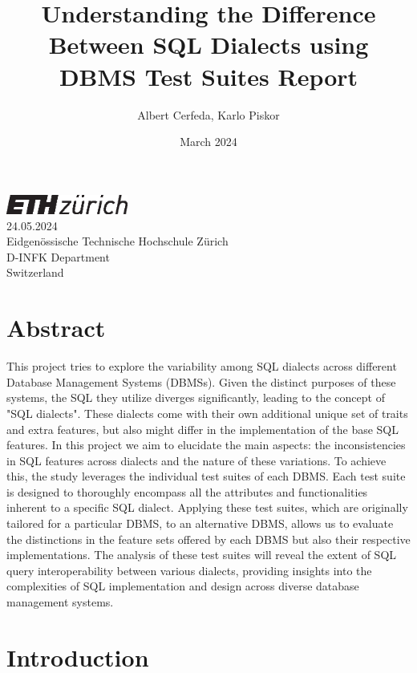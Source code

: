 \documentclass[acmsmall,nonacm]{acmart}
\title{Understanding the Difference Between SQL Dialects using DBMS Test Suites Report}
\author{Albert Cerfeda, Karlo Piskor}
\date{March 2024}
\newcommand\documentdate{24.05.2024}
\begin{document}
\maketitle
\vspace{-0.3cm}
\tableofcontents

\vspace*{\fill}
\begin{center}
\includegraphics[width=0.3\textwidth]{fig/eth_logo_kurz_pos.eps}\\
\documentdate \\
Eidgenössische Technische Hochschule Zürich\\
D-INFK Department\\
Switzerland
\end{center}

\vspace{1cm}
\clearpage
\section{Abstract}

This project tries to explore the variability among SQL dialects across different Database Management Systems (DBMSs). Given the distinct purposes of these systems, the SQL they utilize diverges significantly, leading to the concept of "SQL dialects". These dialects come with their own additional unique set of traits and extra features, but also might differ in the implementation of the base SQL features. In this project we aim to elucidate the main aspects: the inconsistencies in SQL features across dialects and the nature of these variations. To achieve this, the study leverages the individual test suites of each DBMS. Each test suite is designed to thoroughly encompass all the attributes and functionalities inherent to a specific SQL dialect. Applying these test suites, which are originally tailored for a particular DBMS, to an alternative DBMS, allows us to  evaluate the distinctions in the feature sets offered by each DBMS but also their respective implementations. The analysis of these test suites will reveal the extent of SQL query interoperability between various dialects, providing insights into the complexities of SQL implementation and design across diverse database management systems.

\section{Introduction}
\end{document}
